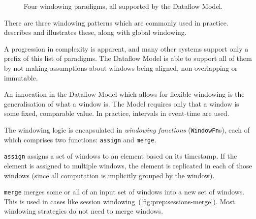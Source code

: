 \begin{figure}[h]
{	}
	\caption{Four windowing paradigms, all supported by the Dataflow Model.}
	\label{fig:prep:window-types}
\end{figure}

There are three windowing patterns which are commonly used in practice.
 describes and illustrates these, along with global windowing.

A progression in complexity is apparent, and many other systems support only a prefix of this list of paradigms.
The Dataflow Model is able to support all of them by not making assumptions about windows being aligned, non-overlapping or immutable.

An innocation in the Dataflow Model which allows for flexible windowing is the generalisation of what a window is.
The Model requires only that a window is some fixed, comparable value.
In practice, intervals in event-time are used.

The windowing logic is encapsulated in \emph{windowing functions} (\verb|WindowFn|s), each of which comprises two functions: \texttt{assign} and \texttt{merge}.

\texttt{assign} assigns a set of windows to an element based on its timestamp.
If the element is assigned to multiple windows, the element is replicated in each of those windows (since all computation is implicitly grouped by the window).

\texttt{merge} merges some or all of an input set of windows into a new set of windows.
This is used in cases like session windowing~(\cref{fig:prep:sessions-merge}).
Most windowing strategies do not need to merge windows.

